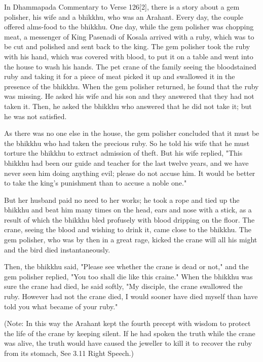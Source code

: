 In Dhammapada Commentary to Verse 126[2], there is a story about a gem polisher, his wife and a bhikkhu, who was an Arahant. Every day, the couple offered alms-food to the bhikkhu. One day, while the gem polisher was chopping meat, a messenger of King Pasenadi of Kosala arrived with a ruby, which was to be cut and polished and sent back to the king. The gem polisher took the ruby with his hand, which was covered with blood, to put it on a table and went into the house to wash his hands. The pet crane of the family seeing the bloodstained ruby and taking it for a piece of meat picked it up and swallowed it in the presence of the bhikkhu. When the gem polisher returned, he found that the ruby was missing. He asked his wife and his son and they answered that they had not taken it. Then, he asked the bhikkhu who answered that he did not take it; but he was not satisfied.

As there was no one else in the house, the gem polisher concluded that it must be the bhikkhu who had taken the precious ruby. So he told his wife that he must torture the bhikkhu to extract admission of theft. But his wife replied, "This bhikkhu had been our guide and teacher for the last twelve years, and we have never seen him doing anything evil; please do not accuse him. It would be better to take the king's punishment than to accuse a noble one."

But her husband paid no need to her works; he took a rope and tied up the bhikkhu and beat him many times on the head, ears and nose with a stick, as a result of which the bhikkhu bled profusely with blood dripping on the floor. The crane, seeing the blood and wishing to drink it, came close to the bhikkhu. The gem polisher, who was by then in a great rage, kicked the crane will all his might and the bird died instantaneously.

Then, the bhikkhu said, "Please see whether the crane is dead or not," and the gem polisher replied, "You too shall die like this craine." When the bhikkhu was sure the crane had died, he said softly, "My disciple, the crane swallowed the ruby. However had not the crane died, I would sooner have died myself than have told you what became of your ruby."

(Note: In this way the Arahant kept the fourth precept with wisdom to protect the life of the crane by keeping silent. If he had spoken the truth while the crane was alive, the truth would have caused the jeweller to kill it to recover the ruby from its stomach, See 3.11 Right Speech.)

